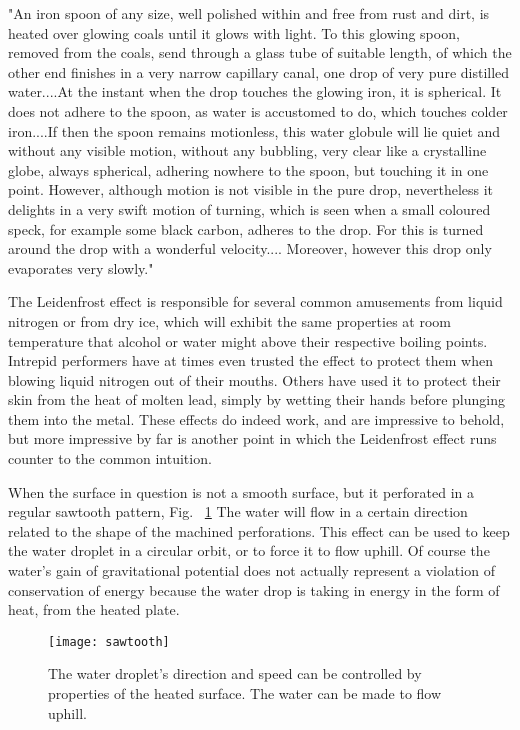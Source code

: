 \documentclass[aps,pre,twocolumn,nofootinbib]{revtex4}
\begin{document}
"An iron spoon of any size, well polished within and free from rust and dirt, is heated over glowing coals until it glows with light.  To this glowing spoon, removed from the coals, send through a glass tube of suitable length, of which the other end finishes in a very narrow capillary canal, one drop of very pure distilled water....At the instant when the drop touches the glowing iron, it is spherical. It does not adhere to the spoon, as water is accustomed to do, which touches colder iron....If then the spoon remains motionless, this water globule will lie quiet and without any visible motion, without any bubbling, very clear like a crystalline globe, always spherical, adhering nowhere to the spoon, but touching it in one point. However, although motion is not visible in the pure drop, nevertheless it delights in a very swift motion of turning, which is seen when a small coloured speck, for example some black carbon, adheres to the drop. For this is turned around the drop with a wonderful velocity.... Moreover, however this drop only evaporates very slowly." \cite{original}

The Leidenfrost effect is responsible for several common amusements from liquid nitrogen or from dry ice, which will exhibit the same properties at room temperature that alcohol or water might above their respective boiling points.  Intrepid performers have at times even trusted the effect to protect them when blowing liquid nitrogen out of their mouths.  Others have used it to protect their skin from the heat of molten lead, simply by wetting their hands before plunging them into the metal.  These effects do indeed work, and are impressive to behold, but more impressive by far is another point in which the Leidenfrost effect runs counter to the common intuition.  

When the surface in question is not a smooth surface, but it perforated in a regular sawtooth pattern, Fig. ~\ref{sawtooth} \cite{sawtooth1} The water will flow in a certain direction related to the shape of the machined perforations.  This effect can be used to keep the water droplet in a circular orbit, or to force it to flow uphill.  Of course the water's gain of gravitational potential does not actually represent a violation of conservation of energy because the water drop is taking in energy in the form of heat, from the heated plate.  \cite{Self_Propelled_Leidenfrost_Droplets, cindy}

\begin{figure}[h]
\centering
\texttt{[image: sawtooth]} 
\caption{The water droplet's direction and speed can be controlled by properties of the heated surface.  The water can be made to flow uphill.}
\label{sawtooth}
\end{figure}
\end{document}
